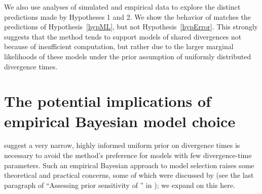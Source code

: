 We also use analyses of simulated and empirical data to explore the distinct
predictions made by Hypotheses 1 and 2.
We show the behavior of \msb matches the predictions of Hypothesis~\ref{hypML},
but not Hypothesis~\ref{hypError}.
This strongly suggests that the method tends to support models of shared
divergences not because of insufficient computation, but rather due to the
larger marginal likelihoods of these models under the prior assumption of
uniformly distributed divergence times.



\section{The potential implications of empirical Bayesian model choice}
\citet{Hickerson2013} suggest a very narrow, highly informed uniform prior on
divergence times is necessary to avoid the method's preference for models with
few divergence-time parameters.
Such an empirical Bayesian approach to model selection raises some theoretical
and practical concerns, some of which were discussed by \citet{Oaks2012} (see
the last paragraph of ``Assessing prior sensitivity of \msb'' in
\citet{Oaks2012}); we expand on this here.

